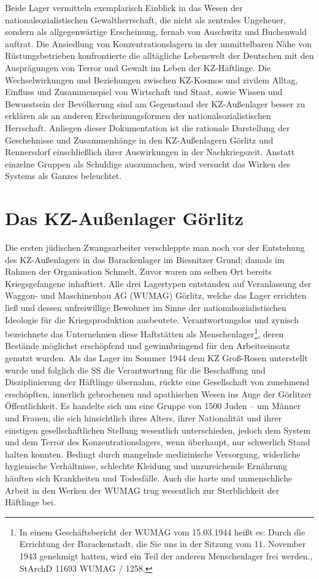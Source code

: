 \documentclass[a4paper,12pt,ngerman,
]{nisebook}
\begin{document}
Beide Lager vermitteln exemplarisch Einblick in das Wesen der nationalsozialistischen Gewaltherrschaft, die nicht als zentrales Ungeheuer, sondern als allgegenwärtige Erscheinung, fernab von Auschwitz und Buchenwald auftrat. Die Ansiedlung von Konzentrationslagern in der unmittelbaren Nähe von Rüstungsbetrieben konfrontierte die alltägliche Lebenswelt der Deutschen mit den Ausprägungen von Terror und Gewalt im Leben der KZ-Häftlinge. Die Wechselwirkungen und Beziehungen zwischen KZ-Kosmos und zivilem Alltag, Einfluss und Zusammenspiel von Wirtschaft und Staat, sowie Wissen und Bewusstsein der Bevölkerung sind am Gegenstand der KZ-Außenlager besser zu erklären als an anderen Erscheinungsformen der nationalsozialistischen Herrschaft. Anliegen dieser Dokumentation ist die rationale Darstellung der Geschehnisse und Zusammenhänge in den KZ-Außenlagern Görlitz und Rennersdorf einschließlich ihrer Auswirkungen in der Nachkriegszeit. Anstatt einzelne Gruppen als Schuldige auszumachen, wird versucht das Wirken des Systems als Ganzes beleuchtet.

 
\chapter{Das KZ-Außenlager Görlitz}

Die ersten jüdischen Zwangsarbeiter verschleppte man noch vor der Entstehung des KZ-Außen\-lagers in das Barackenlager im Biesnitzer Grund; damals im Rahmen der Organisation Schmelt. Zuvor waren am selben Ort bereits Kriegsgefangene inhaftiert. Alle drei Lagertypen entstanden auf Veranlassung der Waggon- und Maschinenbau AG (WUMAG) Görlitz, welche das Lager errichten ließ und dessen unfreiwillige Bewohner im Sinne der nationalsozialistischen Ideologie für die Kriegsproduktion ausbeutete. Verantwortungslos und zynisch bezeichnete das Unternehmen diese Haftstätten als \glqq Menschenlager\grqq\footnote{In einem Geschäftsbericht der WUMAG vom 15.03.1944 heißt es: \glqq Durch die Errichtung der Barackenstadt, die Sie uns in der Sitzung vom 11. November 1943 genehmigt hatten, wird ein Teil der anderen Menschenlager frei werden.\grqq, StArchD 11693 WUMAG / 1258.}, deren Bestände möglichst erschöpfend und gewinnbringend für den Arbeitseinsatz genutzt wurden. \newline
Als das Lager im Sommer 1944 dem KZ Groß-Rosen unterstellt wurde und folglich die SS die Verantwortung für die Beschaffung und Disziplinierung der Häftlinge übernahm, rückte eine Gesellschaft von zunehmend erschöpften, innerlich gebrochenen und apathischen Wesen ins Auge der Görlitzer Öffentlichkeit. Es handelte sich um eine Gruppe von 1500 Juden -- um Männer und Frauen, die sich hinsichtlich ihres Alters, ihrer Nationalität und ihrer einstigen gesellschaftlichen Stellung wesentlich unterschieden, jedoch dem System und dem Terror des Konzentrationslagers, wenn überhaupt, nur schwerlich Stand halten konnten. Bedingt durch mangelnde medizinische Versorgung, widerliche hygienische Verhältnisse, schlechte Kleidung und unzureichende Ernährung häuften sich Krankheiten und Todesfälle. Auch die harte und unmenschliche Arbeit in den Werken der WUMAG trug wesentlich zur Sterblichkeit der Häftlinge bei.
\\
\end{document}
